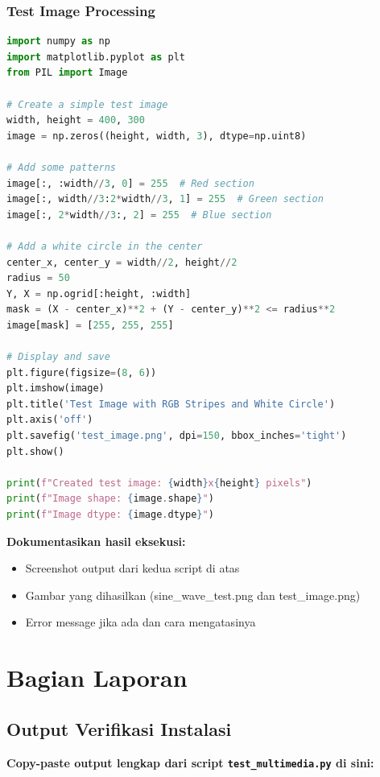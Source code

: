 \documentclass[11pt,a4paper]{article}
\begin{document}
\subsubsection{Test Image Processing}
\begin{lstlisting}[language=Python, caption=Test image processing sederhana]
import numpy as np
import matplotlib.pyplot as plt
from PIL import Image

# Create a simple test image
width, height = 400, 300
image = np.zeros((height, width, 3), dtype=np.uint8)

# Add some patterns
image[:, :width//3, 0] = 255  # Red section
image[:, width//3:2*width//3, 1] = 255  # Green section
image[:, 2*width//3:, 2] = 255  # Blue section

# Add a white circle in the center
center_x, center_y = width//2, height//2
radius = 50
Y, X = np.ogrid[:height, :width]
mask = (X - center_x)**2 + (Y - center_y)**2 <= radius**2
image[mask] = [255, 255, 255]

# Display and save
plt.figure(figsize=(8, 6))
plt.imshow(image)
plt.title('Test Image with RGB Stripes and White Circle')
plt.axis('off')
plt.savefig('test_image.png', dpi=150, bbox_inches='tight')
plt.show()

print(f"Created test image: {width}x{height} pixels")
print(f"Image shape: {image.shape}")
print(f"Image dtype: {image.dtype}")
\end{lstlisting}

\textbf{Dokumentasikan hasil eksekusi:}
\begin{itemize}
    \item Screenshot output dari kedua script di atas
    \item Gambar yang dihasilkan (sine\_wave\_test.png dan test\_image.png)
    \item Error message jika ada dan cara mengatasinya
\end{itemize}

\section{Bagian Laporan}

\subsection{Output Verifikasi Instalasi}
\textbf{Copy-paste output lengkap dari script \texttt{test\_multimedia.py} di sini:}
\end{document}
